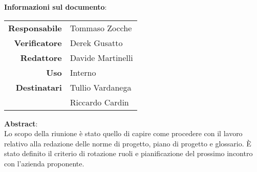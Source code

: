 \begin{center}
\textbf{Informazioni sul documento}: \\
\vspace{0.5cm}

\begin{tabular}{r|l}
    \textbf{Responsabile} & Tommaso Zocche \\ 
    \textbf{Verificatore} & Derek Gusatto\\ 
    \textbf{Redattore} & Davide Martinelli \\ 
    \textbf{Uso} & Interno \\ 
    \textbf{Destinatari} & Tullio Vardanega \\ & Riccardo Cardin \\ 
\end{tabular}

\vfill

\textbf{Abstract}: \\
\vspace{0.5cm}
Lo scopo della riunione è stato quello di capire come procedere con il lavoro relativo alla redazione delle norme di progetto, piano di progetto e glossario. È stato definito il criterio di rotazione ruoli e pianificazione del prossimo incontro con l'azienda proponente.
\end{center}


\bigskip